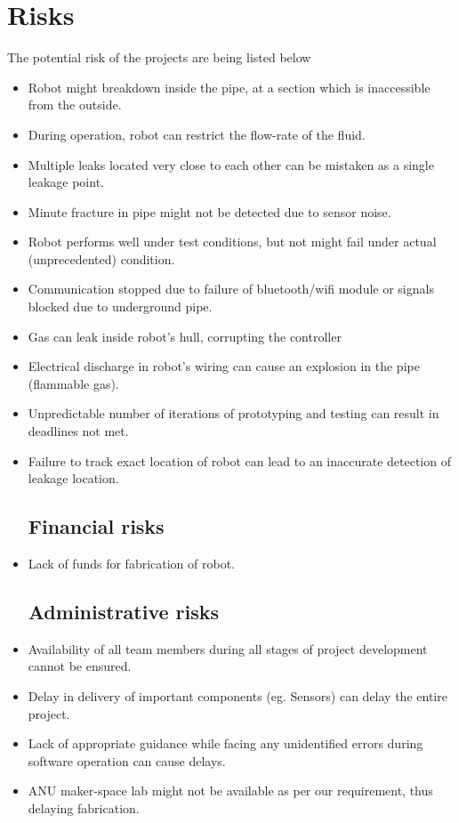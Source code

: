 \documentclass[a4paper,table]{article}
\begin{document}
\section{Risks}
\label{risks}
The potential risk of the projects are being listed below
\begin{itemize}
\subsection{Engineering risks}
    \item{Robot might breakdown inside the pipe, at a section which is inaccessible from the outside.}
    \item {During operation, robot can restrict the flow-rate of the fluid.}
    \item{Multiple leaks located very close to each other can be mistaken as a single leakage point.}
    \item{Minute fracture in pipe might not be detected due to sensor noise.}
    \item{Robot performs well under test conditions, but not might fail under actual (unprecedented) condition.}
    \item{Communication stopped due to failure of bluetooth/wifi module or signals blocked due to underground pipe.}
    \item{Gas can leak inside robot’s hull, corrupting the controller}
    \item{Electrical discharge in robot’s wiring can cause an explosion in the pipe (flammable gas).}
    \item{Unpredictable number of iterations of prototyping and testing can result in deadlines not met.}
    \item{Failure to track exact location of robot can lead to an inaccurate detection of leakage location.}
\subsection{Financial risks}
    \item{Lack of funds for fabrication of robot.}
\subsection{Administrative risks}
    \item{Availability of all team members during all stages of project development cannot be ensured.}
    \item{Delay in delivery of important components (eg. Sensors) can delay the entire project.}
    \item{Lack of appropriate guidance while facing any unidentified errors during software operation can cause delays.}
    \item{ANU maker-space lab might not be available as per our requirement, thus delaying fabrication.}
\end{itemize}
\end{document}
